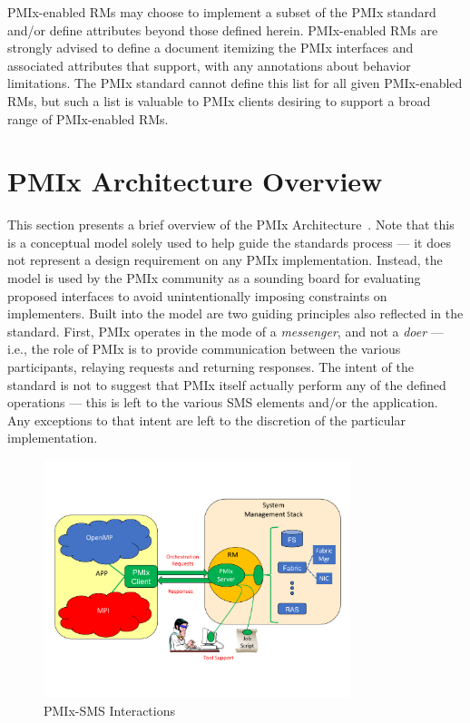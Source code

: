 \ac{PMIx}-enabled \acp{RM} may choose to implement a subset of the \ac{PMIx} standard and/or define attributes beyond those defined herein.
\ac{PMIx}-enabled \acp{RM} are strongly advised to define a document itemizing the \ac{PMIx} interfaces and associated attributes that support, with any annotations about behavior limitations.
The \ac{PMIx} standard cannot define this list for all given \ac{PMIx}-enabled \acp{RM}, but such a list is valuable to \ac{PMIx} clients desiring to support a broad range of \ac{PMIx}-enabled \acp{RM}.



\section{PMIx Architecture Overview}
\label{chap:intro:arch_overview}

This section presents a brief overview of the \ac{PMIx} Architecture~\cite{2017-Castain-EuroMPI}.
Note that this is a conceptual model solely used to help guide the standards process --- it does not represent
a design requirement on any \ac{PMIx} implementation. Instead, the model is used by the
\ac{PMIx} community as a sounding board for evaluating proposed interfaces to avoid unintentionally imposing
constraints on implementers. Built into the model are two guiding principles also reflected in the standard. First,
\ac{PMIx} operates in the mode of a \textit{messenger}, and not a \textit{doer} --- i.e., the role
of \ac{PMIx} is to provide communication between the various participants, relaying requests and returning
responses. The intent of the standard is not to suggest that \ac{PMIx} itself actually perform any of
the defined operations --- this is left to the various \ac{SMS} elements and/or the application. Any exceptions to that intent are left to the discretion of the particular implementation.

\begingroup
\begin{figure}[ht!]
  \begin{center}
    \includegraphics[clip,width=0.8\textwidth]{figs/PMIxRoles.pdf}
  \end{center}
  \caption{PMIx-SMS Interactions}
  \label{fig:roles}
\end{figure}
\endgroup


